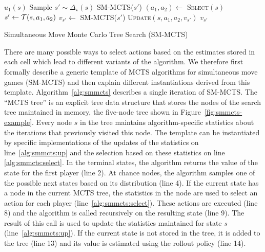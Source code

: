 \begin{algorithm2e}[t]
\small
{}
 {
	\Return $u_1(s)$\;
}
 {
        Sample $s' \sim \Delta_\star(s)$\;
	\Return SM-MCTS($s'$)\;
}
 {
	$(a_1, a_2) \leftarrow$ \textsc{Select}$(s)$\;\label{alg:smmcts:select}
	$s' \leftarrow \mathcal{T}(s,a_1,a_2)$\;
	$v_{s'} \leftarrow $ SM-MCTS($s'$)\;\label{alg:smmcts:reccall}
	\textsc{Update}$(s,a_1,a_2,v_{s'})$\;\label{alg:smmcts:up}
	\Return $v_{s'}$\;
}
\caption{Simultaneous Move Monte Carlo Tree Search (SM-MCTS)}\label{alg:smmcts}
\end{algorithm2e}

There are many possible ways to select actions based on the estimates stored in each cell which lead to different variants of the algorithm.
We therefore first formally describe a generic template of MCTS algorithms for simultaneous move games (SM-MCTS) and then explain different instantiations derived from this template.
Algorithm~\ref{alg:smmcts} describes a single iteration of SM-MCTS.
The ``MCTS tree'' is an explicit tree data structure that stores the nodes of the search tree maintained in memory,
\eg the five-node tree shown in Figure~\ref{fig:smmcts-example}.
Every node $s$ in the tree maintains algorithm-specific statistics about the iterations that previously visited this node.
The template can be instantiated by specific implementations of the updates of the statistics on line~\ref{alg:smmcts:up} and the selection based on these statistics on line \ref{alg:smmcts:select}.
In the terminal states, the algorithm returns the value of the state for the first player (line 2).
At chance nodes, the algorithm samples one of the possible next states based on its distribution (line 4).
If the current state has a node in the current MCTS tree, the statistics in the node are used to select an action for each player (line~\ref{alg:smmcts:select}).
These actions are executed (line 8) and the algorithm is called recursively on the resulting state (line 9).
The result of this call is used to update the statistics maintained for state $s$ (line~\ref{alg:smmcts:up}).
If the current state is not stored in the tree, it is added to the tree (line 13) and its value is estimated using the rollout policy (line 14).

